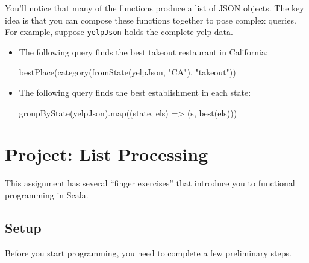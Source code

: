 \documentclass[9pt]{extbook}
\begin{document}
You'll notice that many of the functions produce a list of JSON
objects. The key idea is that you can compose these functions together to
pose complex queries. For example, suppose \texttt{yelpJson} holds the
complete yelp data.

\begin{itemize}
\item The following query finds the best takeout restaurant in California:
    \begin{scalacode}
    bestPlace(category(fromState(yelpJson, "CA"), "takeout"))
    \end{scalacode}

\item The following query finds the best establishment in each state:
    \begin{scalacode}
    groupByState(yelpJson).map((state, els) => (s, best(els)))
    \end{scalacode}
\end{itemize}



\chapter{Project: List Processing}

This assignment has several ``finger exercises'' that introduce you
to functional programming in Scala.

\section{Setup}

Before you start programming, you need to complete a few preliminary steps.
\end{document}
